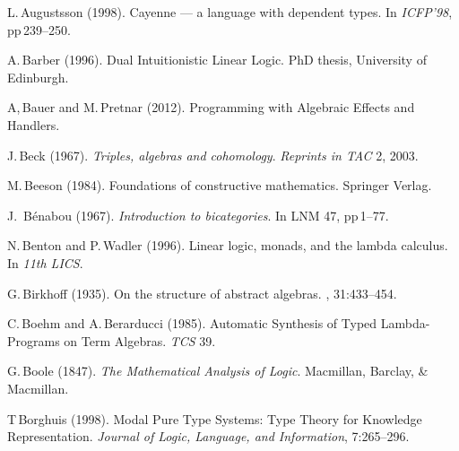 \documentclass[11pt,twocolumn]{article}
\begin{document}
{\begin{thebibliography}{000}
L.\,Augustsson (1998).
\newblock Cayenne --- a language with dependent types.
\newblock In \emph{ICFP'98}, pp\,239--250.

A.\,Barber (1996).
\newblock Dual Intuitionistic Linear Logic. 
\newblock PhD thesis, University of Edinburgh. 

A,\,Bauer and M.\,Pretnar (2012).
\newblock Programming with Algebraic Effects and Handlers.

J.\,Beck (1967).
\newblock \emph{Triples, algebras and cohomology}.
\newblock \emph{Reprints in TAC} 2, 2003. 


M.\,Beeson (1984).
\newblock Foundations of constructive mathematics.
\newblock Springer Verlag.


J.~B{\'e}nabou (1967). 
\newblock \emph{Introduction to bicategories}. 
\newblock In LNM 47, pp\,1--77. 

N.\,Benton and P.\,Wadler (1996). 
\newblock Linear logic, monads, and the lambda calculus.
\newblock In \emph{11th LICS}.

G.\,Birkhoff (1935).
\newblock On the structure of abstract algebras.
, 31:433--454. 
  
C.\,Boehm and A.\,Berarducci (1985). 
\newblock Automatic Synthesis of Typed Lambda-Programs on Term Algebras.
\newblock \emph{TCS} 39.

G.\,Boole (1847).
\newblock \emph{The Mathematical Analysis of Logic}.%
\newblock Macmillan, Barclay, \& Macmillan. 

T\,Borghuis (1998).
\newblock Modal Pure Type Systems: Type Theory for Knowledge
Representation.  
\newblock \emph{Journal of Logic, Language, and Information}, 7:265--296. 


\end{thebibliography}}
\end{document}

